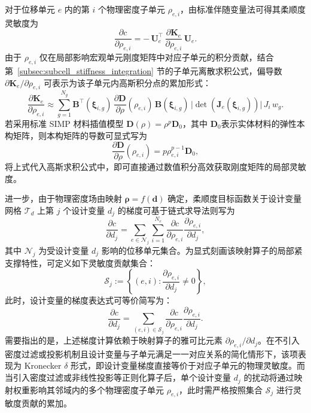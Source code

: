 对于位移单元 $e$ 内的第 $i$ 个物理密度子单元 $\rho_{e,i}$，由标准伴随变量法可得其柔顺度灵敏度为
\[
\frac{\partial c}{\partial \rho_{e,i}} = -\,\boldsymbol U_e^{\top}\,\frac{\partial \boldsymbol K_e}{\partial \rho_{e,i}}\,\boldsymbol U_e.
\]
由于 $\rho_{e,i}$ 仅在局部影响宏观单元刚度矩阵中对应子单元的积分贡献，结合第~\ref{subsec:subcell_stiffness_integration} 节的子单元离散求积公式，偏导数 $\partial\boldsymbol{K}_e/\partial\rho_{e,i}$ 可表示为该子单元内高斯积分点的累加形式：
\begin{equation} \label{eq:ch4_subcell_stiffness_sens}
	\frac{\partial \boldsymbol{K}_e}{\partial \rho_{e,i}} \approx \sum_{g=1}^{N_g} \boldsymbol{B}^{\top}(\boldsymbol\xi_{i,g})\,\frac{\partial \boldsymbol{D}}{\partial \rho}(\rho_{e,i})\,\boldsymbol{B}(\boldsymbol\xi_{i,g})\, \big|\det(\boldsymbol{J}_e(\boldsymbol\xi_{i,g}))\big|\, J_i\, w_g.
\end{equation}
若采用标准 SIMP 材料插值模型 $\boldsymbol{D}(\rho)=\rho^p\boldsymbol{D}_0$，其中 $\boldsymbol{D}_0$表示实体材料的弹性本构矩阵，则本构矩阵的导数可显式写为
\[
\frac{\partial \boldsymbol{D}}{\partial \rho}(\rho_{e,i}) = p\rho_{e,i}^{p-1}\boldsymbol{D}_0,
\]
将上式代入高斯求积公式中，即可直接通过数值积分高效获取刚度矩阵的局部灵敏度。

进一步，由于物理密度场由映射 $\boldsymbol{\rho}=f(\boldsymbol{d})$ 确定，柔顺度目标函数关于设计变量网格 $\mathcal{T}_d$ 上第 $j$ 个设计变量 $d_j$ 的梯度可基于链式求导法则写为
\[
\frac{\partial c}{\partial d_{j}} = \sum_{e \in \mathcal{N}_j} \sum_{i=1}^{N_e} \frac{\partial c}{\partial \rho_{e,i}} \frac{\partial \rho_{e,i}}{\partial d_{j}},
\]
其中 $\mathcal{N}_j$ 为受设计变量 $d_j$ 影响的位移单元集合。为显式刻画该映射算子的局部紧支撑特性，可定义如下灵敏度贡献集合：
\[
\mathcal{S}_{j} := \left\{(e,i) : \frac{\partial \rho_{e,i}}{\partial d_{j}} \neq 0 \right\},
\]
此时，设计变量的梯度表达式可等价简写为：
\begin{equation} \label{eq:ch4_design_var_grad}
	\frac{\partial c}{\partial d_{j}} = \sum_{(e,i) \in \mathcal{S}_{j}} \frac{\partial c}{\partial \rho_{e,i}} \frac{\partial \rho_{e,i}}{\partial d_{j}}.
\end{equation}
需要指出的是，上述梯度计算依赖于映射算子的雅可比元素 $\partial \rho_{e,i}/\partial d_{j}$。在不引入密度过滤或投影机制且设计变量与子单元满足一一对应关系的简化情形下，该项表现为 Kronecker $\delta$ 形式，即设计变量梯度直接等价于对应子单元的物理灵敏度。而当引入密度过滤或非线性投影等正则化算子后，单个设计变量 $d_{j}$ 的扰动将通过映射权重影响其邻域内的多个物理密度子单元 $\rho_{e,i}$，此时需严格按照集合 $\mathcal{S}_j$ 进行灵敏度贡献的累加。


